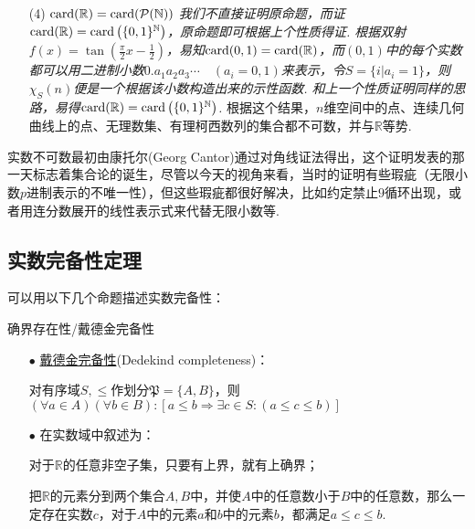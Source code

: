 \documentclass[main.tex]{subfiles}
\begin{document}
\begin{itemize}
    \item [(4)] \({\rm card}(\mathbb{R}) = {\rm card}(\mathcal{P}(\mathbb{N})) \)
    \newline
    \textit{
        我们不直接证明原命题，而证\({\rm card}(\mathbb{R})={\rm card}\left(\{0,1\}^\mathbb{N}\right)\)，原命题即可根据上个性质得证.
        \newline
        根据双射\(f(x)=\tan\left(\frac{\pi}{2}x-\frac{1}{2}\right)\)，易知\({\rm card}(0,1)={\rm card}(\mathbb{R})\)，而\((0,1)\)中的每个实数都可以用二进制小数\(0.a_1a_2a_3\cdots\quad(a_i=0,1)\)来表示，令\(S=\{i|a_i=1\}\)，则\(\chi_S(n)\)便是一个根据该小数构造出来的示性函数. 和上一个性质证明同样的思路，易得\({\rm card}(\mathbb{R})={\rm card}\left(\{0,1\}^\mathbb{N}\right)\).
    }
    根据这个结果，\(n\)维空间中的点、连续几何曲线上的点、无理数集、有理柯西数列的集合都不可数，并与\(\mathbb{R}\)等势.
    
\end{itemize}

实数不可数最初由康托尔(Georg Cantor)通过对角线证法得出，这个证明发表的那一天标志着集合论的诞生，尽管以今天的视角来看，当时的证明有些瑕疵（无限小数\(p\)进制表示的不唯一性），但这些瑕疵都很好解决，比如约定禁止\(9\)循环出现，或者用连分数展开的线性表示式来代替无限小数等.


\subsection{实数完备性定理}

可以用以下几个命题描述实数完备性：
\begin{theorem}{确界存在性/戴德金完备性}
    \begin{itemize}
        \item [\(\bullet\)] \uline{戴德金完备性}(Dedekind completeness)：
        \par 对有序域\(S,\leq\)作划分\(\mathfrak{P} = \{A,B\}\)，则\((\forall a \in A)(\forall b \in B):[a \leq b \Longrightarrow \exists c \in S:(a \leq c \leq b)]\)
        \item [\(\bullet\)] 在实数域中叙述为：
        \par 对于\(\mathbb{R}\)的任意非空子集，只要有上界，就有上确界；
        \par 把\(\mathbb{R}\)的元素分到两个集合\(A,B\)中，并使\(A\)中的任意数小于\(B\)中的任意数，那么一定存在实数\(c\)，对于\(A\)中的元素\(a\)和\(b\)中的元素\(b\)，都满足\(a\leq c\leq b\).
    \end{itemize}
\end{theorem}
\end{document}
